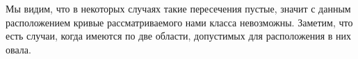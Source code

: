 \documentclass[11pt]{book}
\numberwithin{exercise}{chapter}
\begin{document}
Мы видим, что в некоторых случаях такие пересечения пустые, значит с данным расположением кривые рассматриваемого нами класса невозможны.
Заметим, что есть случаи, когда имеются по две области, допустимых для расположения в них овала.







\makeatother
\end{document}
